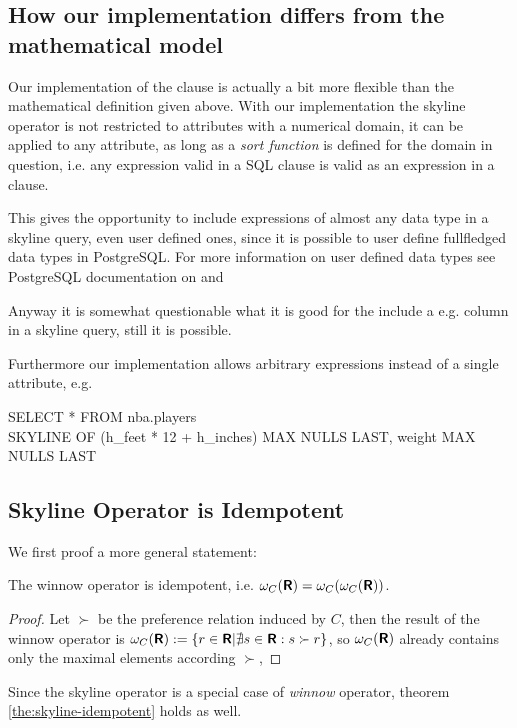 \subsection{How our implementation differs from the mathematical model}
Our implementation of the  clause is actually a bit more flexible than the mathematical definition given above. With our implementation the skyline operator is not restricted to attributes with a numerical domain, it can be applied to any attribute, as long as a \emph{sort function} is defined for the domain in question, i.e.\/ any expression valid in a SQL  clause is valid as an expression in a  clause.

This gives the opportunity to include expressions of almost any data type in a skyline query, even user defined ones, since it is possible to user define fullfledged data types in PostgreSQL. For more information on user defined data types see PostgreSQL documentation on  and 

Anyway it is somewhat questionable what it is good for the include a e.g.  column in a skyline query, still it is possible.

Furthermore our implementation allows arbitrary expressions instead of a single attribute, e.g.

\begin{sql}
SELECT * FROM nba.players \\
SKYLINE OF (h\_feet * 12 + h\_inches) MAX NULLS LAST, weight MAX NULLS LAST
\end{sql}

\subsection{Skyline Operator is Idempotent}
We first proof a more general statement:
\begin{theorem}\label{the:skyline-idempotent}
The winnow operator is idempotent, i.e. $\omega_C(\textnormal{\bf\textsf{R}})=\omega_C(\omega_C(\textnormal{\bf\textsf{R}}))$.
\end{theorem}
\begin{proof}
Let $\succ$ be the preference relation induced by $C$, then the result of the winnow operator is $\omega_C(\textnormal{\bf\textsf{R}}) := \{r \in \textnormal{\bf\textsf{R}} | \nexists s \in \textnormal{\bf\textsf{R}} : s \succ r \}$, so $\omega_C(\textnormal{\bf\textsf{R}})$ already contains only the maximal elements according $\succ$, 
\end{proof}
Since the skyline operator is a special case of \emph{winnow} operator, theorem \ref{the:skyline-idempotent} holds as well.


